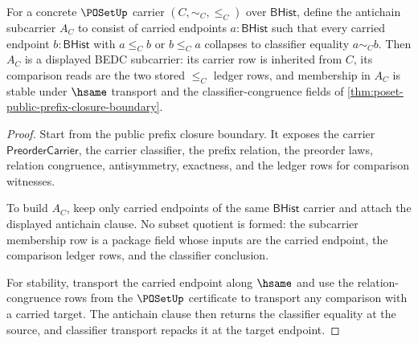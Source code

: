\begin{theorem}
\label{thm:poset-antichain-subcarrier-certificate}
For a concrete $\POSetUp$ carrier $(C,\sim_C,\le_C)$ over $\mathsf{BHist}$,
define the antichain subcarrier $A_C$ to consist of carried endpoints
$a:\mathsf{BHist}$ such that every carried endpoint $b:\mathsf{BHist}$ with
$a\le_C b$ or $b\le_C a$ collapses to classifier equality $a\sim_C b$. Then
$A_C$ is a displayed BEDC subcarrier: its carrier row is inherited from $C$,
its comparison reads are the two stored $\le_C$ ledger rows, and membership in
$A_C$ is stable under $\hsame$ transport and the classifier-congruence fields
of \autoref{thm:poset-public-prefix-closure-boundary}.
\end{theorem}
\begin{proof}
Start from the public prefix closure boundary. It exposes the carrier
$\mathsf{PreorderCarrier}$, the carrier classifier, the prefix relation, the
preorder laws, relation congruence, antisymmetry, exactness, and the ledger
rows for comparison witnesses.

To build $A_C$, keep only carried endpoints of the same $\mathsf{BHist}$
carrier and attach the displayed antichain clause. No subset quotient is
formed: the subcarrier membership row is a package field whose inputs are the
carried endpoint, the comparison ledger rows, and the classifier conclusion.

For stability, transport the carried endpoint along $\hsame$ and use the
relation-congruence rows from the $\POSetUp$ certificate to transport any
comparison with a carried target. The antichain clause then returns the
classifier equality at the source, and classifier transport repacks it at the
target endpoint.
\end{proof}

